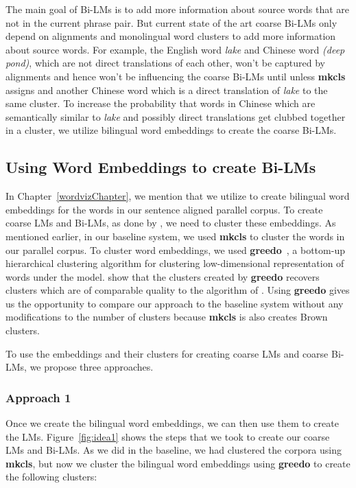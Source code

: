 The main goal of Bi-LMs is to add more information about source words that are not in the current phrase pair. But current state of the art coarse Bi-LMs only depend on alignments and monolingual word clusters to add more information about source words. For example, the English word \textit{lake} and Chinese word  \textit{(deep pond)}, which are not direct translations of each other, won't be captured by alignments and hence won't be influencing the coarse Bi-LMs until unless \textbf{mkcls} assigns  and another Chinese word which is a direct translation of \textit{lake} to the same cluster. To increase the probability that words in Chinese which are semantically similar to \textit{lake} and possibly direct translations get clubbed together in a cluster, we utilize bilingual word embeddings to create the coarse Bi-LMs.

\subsection{Using Word Embeddings to create Bi-LMs}\label{approaches}
In Chapter~\ref{wordvizChapter}, we mention that we utilize \cite{Hermann14} to create bilingual word embeddings for the words in our sentence aligned parallel corpus. To create coarse LMs and Bi-LMs, as done by \cite{Stewart2014}, we need to cluster these embeddings. As mentioned earlier, in our baseline system, we used \textbf{mkcls} to cluster the words in our parallel corpus. To cluster word embeddings, we used \textbf{greedo}~\cite{Stratos2014}, a bottom-up hierarchical clustering algorithm for clustering low-dimensional representation of words under the \cite{Brown1992} model. \cite{Stratos2014} show that the clusters created by \textbf{greedo} recovers clusters which are of comparable quality to the algorithm of \cite{Brown1992}. Using \textbf{greedo} gives us the opportunity to compare our approach to the baseline system without any modifications to the number of clusters because \textbf{mkcls} is also creates Brown clusters.

To use the embeddings and their clusters for creating coarse LMs and coarse Bi-LMs, we propose three approaches.

\subsubsection{Approach 1}\label{approach1}
Once we create the bilingual word embeddings, we can then use them to create the LMs. Figure~\ref{fig:idea1} shows the steps that we took to create our coarse LMs and Bi-LMs. As we did in the baseline, we had clustered the corpora using \textbf{mkcls}, but now we cluster the bilingual word embeddings using \textbf{greedo} to create the following clusters:

